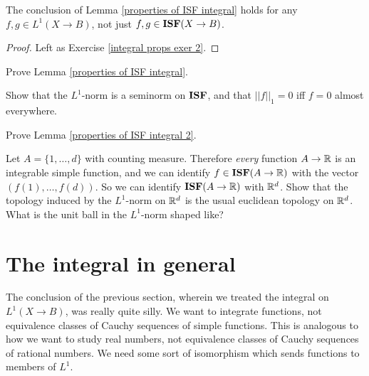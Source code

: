 \begin{lemma}
\label{properties of ISF integral 2}
The conclusion of Lemma \ref{properties of ISF integral} holds for any $f,g \in L^1(X \to B)$, not just $f,g \in \mathbf{ISF}(X \to B)$.
\end{lemma}
\begin{proof}
Left as Exercise \ref{integral props exer 2}.
\end{proof}

\begin{exercise}
\label{integral props exer 1}
Prove Lemma \ref{properties of ISF integral}.
\end{exercise}

\begin{exercise}
\label{L1 norm exer}
Show that the $L^1$-norm is a seminorm on $\mathbf{ISF}$, and that $||f||_1 = 0$ iff $f = 0$ almost everywhere.
\end{exercise}

\begin{exercise}
\label{integral props exer 2}
Prove Lemma \ref{properties of ISF integral 2}.
\end{exercise}

\begin{exercise}
Let $A = \{1, \dots, d\}$ with counting measure. Therefore \emph{every} function $A \to \mathbb{R}$ is an integrable simple function, and we can identify $f \in \mathbf{ISF}(A \to \mathbb{R})$ with the vector $(f(1), \dots, f(d))$.
So we can identify $\mathbf{ISF}(A \to \mathbb{R})$ with $\mathbb{R}^d$.
Show that the topology induced by the $L^1$-norm on $\mathbb{R}^d$ is the usual euclidean topology on $\mathbb{R}^d$.
What is the unit ball in the $L^1$-norm shaped like?
\end{exercise}

\section{The integral in general}
The conclusion of the previous section, wherein we treated the integral on $L^1(X \to B)$, was really quite silly.
We want to integrate functions, not equivalence classes of Cauchy sequences of simple functions.
This is analogous to how we want to study real numbers, not equivalence classes of Cauchy sequences of rational numbers.
We need some sort of isomorphism which sends functions to members of $L^1$.

